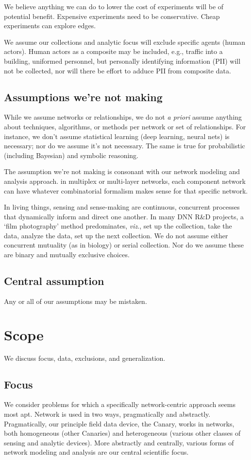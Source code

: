 \documentclass{article} %
\begin{document}
We believe anything we can do to lower the cost of experiments will be of potential benefit. Expensive experiments need to be conservative. Cheap experiments can explore edges. 

We assume our collections and analytic focus will exclude specific agents (human actors). Human actors as a composite may be included, e.g., traffic into a building, uniformed personnel, but personally identifying information (PII) will not be collected, nor will there be effort to adduce PII from composite data. 

\subsection{Assumptions we're not making}
While we assume networks or relationships, we do not \textit{a priori} assume anything about techniques, algorithms, or methods per network or set of relationships. For instance, we don't assume statistical learning (deep learning, neural nets) is necessary; nor do we assume it's not necessary. The same is true for probabilistic (including Bayesian) and symbolic reasoning. 

The assumption we're not making is consonant with our network modeling and analysis approach. in multiplex or multi-layer networks, each component network can have whatever combinatorial formalism makes sense for that specific network. 

In living things, sensing and sense-making are continuous, concurrent processes that dynamically inform and direct one another. In many DNN R\&D projects, a `film photography' method predominates, \textit{viz}., set up the collection, take the data, analyze the data, set up the next collection. We do not assume either concurrent mutuality (as in biology) or serial collection. Nor do we assume these are binary and mutually exclusive choices.

\subsection{Central assumption}
Any or all of our assumptions may be mistaken.


\pagebreak\section{Scope}
We discuss focus, data, exclusions, and generalization.

\subsection{Focus}
We consider problems for which a specifically network-centric approach seems most apt. Network is used in two ways, pragmatically and abstractly. Pragmatically, our principle field data device, the Canary, works in networks, both homogeneous (other Canaries) and heterogeneous (various other classes of sensing and analytic devices). More abstractly and centrally, various forms of network modeling and analysis are our central scientific focus. 
\end{document}
